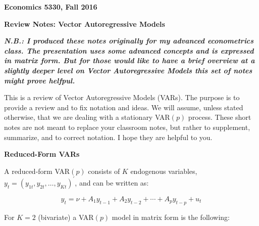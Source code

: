 \documentclass[11pt]{article}
\begin{document}
\pagestyle{empty}

\textbf{Economics 5330, Fall 2016}

\vspace{3.5mm}

\textbf{Review Notes: Vector Autoregressive Models}
\vspace{3.5mm}

\textbf{\textit{N.B.: I produced these notes originally for my advanced econometrics class. The presentation uses some
advanced concepts and is expressed in matrix form. But for those would like to have a brief overview at a slightly
deeper level on Vector Autoregressive Models this set of notes might prove helfpul.}}


\vspace{5mm}
This is a review of Vector Autoregressive Models (VARs).  The purpose is to
provide a review and to fix notation and ideas. We will assume, unless 
stated otherwise, that we are dealing with a stationary VAR$(p)$ process. These
short notes are not meant to replace your classroom notes, but rather to supplement,
summarize, and to correct notation.  I hope they are helpful to you.

\vspace{10mm}
\textbf{Reduced-Form VARs}

\vspace{3.5mm}
A reduced-form VAR$(p)$ consists of $K$ endogenous variables, 
$y_{t} = (y_{1t}, y_{2t}, \ldots, y_{Kt})^{\prime}$, and can be written as:

\begin{equation*}
y_{t} = \nu + A_{1} y_{t-1} + A_{2} y_{t-2} + \cdots + A_{p} y_{t-p} + u_{t}
\end{equation*} 

\vspace{3.5mm}
For $K=2$ (bivariate) a VAR$(p)$ model in matrix form is the following:
\end{document}
